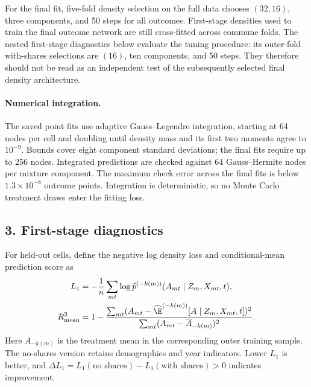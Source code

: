 \documentclass{article}
\begin{document}
For the final fit, five-fold density selection on the full data chooses $(32,16)$, three components, and 50 steps for all outcomes. First-stage densities used to train the final outcome network are still cross-fitted across commune folds. The nested first-stage diagnostics below evaluate the tuning procedure: its outer-fold with-shares selections are $(16)$, ten components, and 50 steps. They therefore should not be read as an independent test of the subsequently selected final density architecture.

\paragraph{Numerical integration.}
The saved point fits use adaptive Gauss--Legendre integration, starting at 64 nodes per cell and doubling until density mass and its first two moments agree to $10^{-9}$. Bounds cover eight component standard deviations; the final fits require up to 256 nodes. Integrated predictions are checked against 64 Gauss--Hermite nodes per mixture component. The maximum check error across the final fits is below $1.3\times10^{-8}$ outcome points. Integration is deterministic, so no Monte Carlo treatment draws enter the fitting loss.

\subsection*{3. First-stage diagnostics}
For held-out cells, define the negative log density loss and conditional-mean prediction score as
\begin{align}
L_1&=-\frac1n\sum_{mt}\log\widehat p^{(-k(m))}(A_{mt}\mid Z_m,X_{mt},t),\\
R^2_{\mathrm{mean}}&=1-
\frac{\sum_{mt}(A_{mt}-\widehat{\E}^{(-k(m))}[A\mid Z_m,X_{mt},t])^2}
{\sum_{mt}(A_{mt}-\overline A_{-k(m)})^2}.
\end{align}
Here $\overline A_{-k(m)}$ is the treatment mean in the corresponding outer training sample. The no-shares version retains demographics and year indicators. Lower $L_1$ is better, and $\Delta L_1=L_1(\text{no shares})-L_1(\text{with shares})>0$ indicates improvement.
\end{document}

